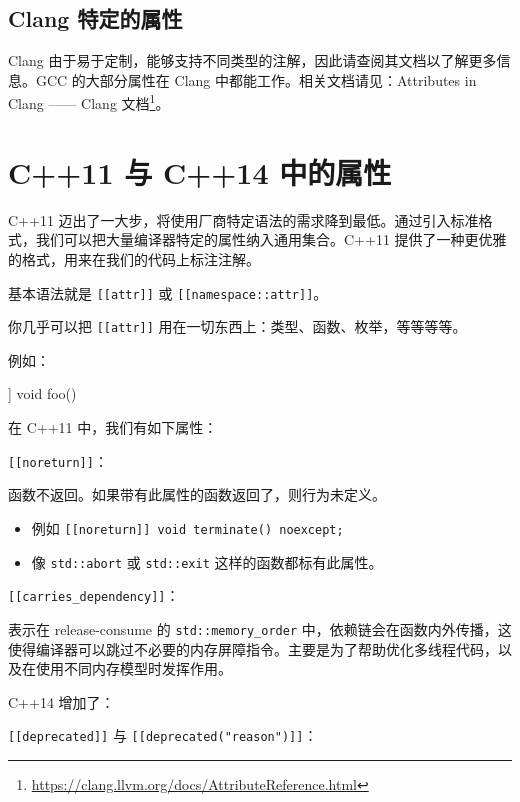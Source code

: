 \subsection{Clang 特定的属性}

Clang 由于易于定制，能够支持不同类型的注解，因此请查阅其文档以了解更多信息。GCC 的大部分属性在 Clang 中都能工作。相关文档请见：Attributes in Clang —— Clang 文档\footnote{\url{https://clang.llvm.org/docs/AttributeReference.html}}。

\section{C++11 与 C++14 中的属性}

C++11 迈出了一大步，将使用厂商特定语法的需求降到最低。通过引入标准格式，我们可以把大量编译器特定的属性纳入通用集合。C++11 提供了一种更优雅的格式，用来在我们的代码上标注注解。

基本语法就是 \texttt{\texttt{\texttt{[[attr]]}}} 或 \texttt{\texttt{\texttt{[[namespace::attr]]}}}。

你几乎可以把 \texttt{\texttt{\texttt{[[attr]]}}} 用在一切东西上：类型、函数、枚举，等等等等。

例如：

\begin{codebox}[cpp]
[[abc]] void foo()
{
}
\end{codebox}

在 C++11 中，我们有如下属性：

\texttt{\texttt{\texttt{[[noreturn]]}}}：

函数不返回。如果带有此属性的函数返回了，则行为未定义。

\begin{itemize}
\item 例如 \texttt{\texttt{\texttt{[[noreturn]]}} void terminate() noexcept;}
\item 像 \texttt{std::abort} 或 \texttt{std::exit} 这样的函数都标有此属性。
\end{itemize}

\texttt{\texttt{\texttt{[[carries\_dependency]]}}}：

表示在 release-consume 的 \texttt{std::memory\_order} 中，依赖链会在函数内外传播，这使得编译器可以跳过不必要的内存屏障指令。主要是为了帮助优化多线程代码，以及在使用不同内存模型时发挥作用。

C++14 增加了：

\texttt{\texttt{\texttt{[[deprecated]]}}} 与 \texttt{\texttt{\texttt{[[deprecated("reason")]]}}}：

